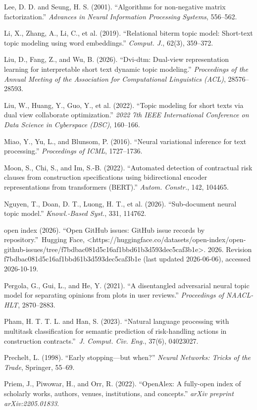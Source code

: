 \documentclass[Journal,letterpaper,NoLists]{ascelike-new}
\begin{document}
Lee, D. D. and Seung, H. S. (2001). ``Algorithms for non-negative matrix factorization.'' \emph{Advances in Neural Information Processing Systems}, 556--562.

Li, X., Zhang, A., Li, C., et al. (2019). ``Relational biterm topic model: Short-text topic modeling using word embeddings.'' \emph{Comput. J.}, 62(3), 359--372.

Liu, D., Fang, Z., and Wu, B. (2026). ``Dvi-dtm: Dual-view representation learning for interpretable short text dynamic topic modeling.'' \emph{Proceedings of the Annual Meeting of the Association for Computational Linguistics (ACL)}, 28576--28593.

Liu, W., Huang, Y., Guo, Y., et al. (2022). ``Topic modeling for short texts via dual view collaborate optimization.'' \emph{2022 7th IEEE International Conference on Data Science in Cyberspace (DSC)}, 160--166.

Miao, Y., Yu, L., and Blunsom, P. (2016). ``Neural variational inference for text processing.'' {\em Proceedings of ICML}, 1727--1736.

Moon, S., Chi, S., and Im, S.-B. (2022). ``Automated detection of contractual risk clauses from construction specifications using bidirectional encoder representations from transformers ({BERT}).'' \emph{Autom. Constr.}, 142, 104465.

Nguyen, T., Doan, D. T., Luong, H. T., et al. (2026). ``Sub-document neural topic model.'' \emph{Knowl.-Based Syst.}, 331, 114762.

open index (2026). ``Open {GitHub} issues: {GitHub} issue records by repository.''\ Hugging Face, <https://huggingface.co/datasets/open-index/open-github-issues/tree/f7bdbac081d5c16af1bbd61b3d593dec5caf3b1e>. 2026. Revision f7bdbac081d5c16af1bbd61b3d593dec5caf3b1e (last updated 2026-06-06), accessed 2026-10-19.

Pergola, G., Gui, L., and He, Y. (2021). ``A disentangled adversarial neural topic model for separating opinions from plots in user reviews.'' \emph{Proceedings of NAACL-HLT}, 2870--2883.

Pham, H. T. T. L. and Han, S. (2023). ``Natural language processing with multitask classification for semantic prediction of risk-handling actions in construction contracts.''\ \emph{J. Comput. Civ. Eng.}, 37(6), 04023027.

Prechelt, L. (1998). ``Early stopping---but when?'' \emph{Neural Networks: Tricks of the Trade}, Springer, 55--69.

Priem, J., Piwowar, H., and Orr, R. (2022). ``{OpenAlex}: A fully-open index of scholarly works, authors, venues, institutions, and concepts.'' \emph{arXiv preprint arXiv:2205.01833}.
\end{document}
